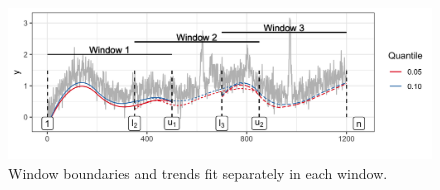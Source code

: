 \documentclass[12pt]{article}
\newcommand{\M}[1]{{\bm{\mathbf{\MakeUppercase{#1}}}}} %
\begin{document}
%	 
	\begin{figure}[!t] 
		\centering
		\includegraphics[width = 0.8\linewidth]{Figures/overlapping_windows.png}
		\caption{Window boundaries and trends fit separately in each window.}		
		\label{fig:windows}
	\end{figure}
\end{document}
